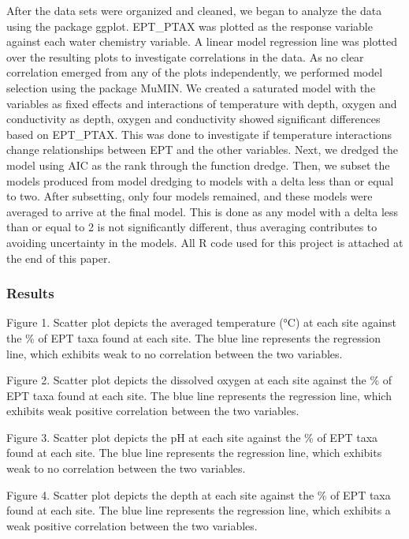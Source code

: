 \documentclass[]{article}
\begin{document}
After the data sets were organized and cleaned, we began to analyze the
data using the package ggplot. EPT\_PTAX was plotted as the response
variable against each water chemistry variable. A linear model
regression line was plotted over the resulting plots to investigate
correlations in the data. As no clear correlation emerged from any of
the plots independently, we performed model selection using the package
MuMIN. We created a saturated model with the variables as fixed effects
and interactions of temperature with depth, oxygen and conductivity as
depth, oxygen and conductivity showed significant differences based on
EPT\_PTAX. This was done to investigate if temperature interactions
change relationships between EPT and the other variables. Next, we
dredged the model using AIC as the rank through the function dredge.
Then, we subset the models produced from model dredging to models with a
delta less than or equal to two. After subsetting, only four models
remained, and these models were averaged to arrive at the final model.
This is done as any model with a delta less than or equal to 2 is not
significantly different, thus averaging contributes to avoiding
uncertainty in the models. All R code used for this project is attached
at the end of this paper.

\subsubsection{Results}\label{results}

Figure 1. Scatter plot depicts the averaged temperature (°C) at each
site against the \% of EPT taxa found at each site. The blue line
represents the regression line, which exhibits weak to no correlation
between the two variables.

Figure 2. Scatter plot depicts the dissolved oxygen at each site against
the \% of EPT taxa found at each site. The blue line represents the
regression line, which exhibits weak positive correlation between the
two variables.

Figure 3. Scatter plot depicts the pH at each site against the \% of EPT
taxa found at each site. The blue line represents the regression line,
which exhibits weak to no correlation between the two variables.

Figure 4. Scatter plot depicts the depth at each site against the \% of
EPT taxa found at each site. The blue line represents the regression
line, which exhibits a weak positive correlation between the two
variables.
\end{document}

